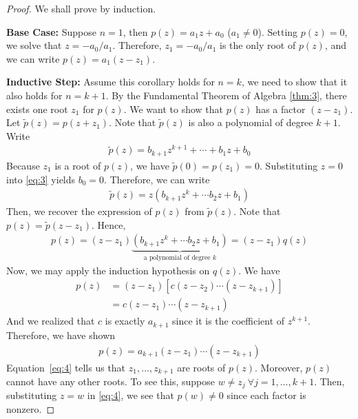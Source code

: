 \documentclass[thmcnt=section, color=cyan, 12pt]{my-elegantbook}
\begin{document}
\begin{proof}
    We shall prove by induction.

    \noindent\textbf{Base Case:} Suppose $n = 1$, then $p(z) = a_1 z + a_0$ ($a_1 \neq 0$). Setting $p(z) = 0$, we solve that $z = -a_0 / a_1$. Therefore, $z_1 = -a_0 / a_1$ is the only root of $p(z)$, and we can write $p(z) = a_1(z - z_1)$.

    \noindent\textbf{Inductive Step:} Assume this corollary holds for $n = k$, we need to show that it also holds for $n = k + 1$.
    By the Fundamental Theorem of Algebra \ref{thm:3}, there exists one root $z_1$ for $p(z)$.
    We want to show that $p(z)$ has a factor $(z - z_1)$.
    Let $\tilde{p}(z) = p(z + z_1)$.
    Note that $\tilde{p}(z)$ is also a polynomial of degree $k + 1$.
    Write
    \begin{align}
        \tilde{p}(z) = b_{k+1} z^{k+1} + \cdots + b_1 z + b_0
        \label{eq:3}
    \end{align}
    Because $z_1$ is a root of $p(z)$, we have $\tilde{p}(0) = p(z_1) = 0$. Substituting $z=0$ into \eqref{eq:3} yields $b_0 = 0$.
    Therefore, we can write
    \begin{align*}
        \tilde{p}(z) = z (b_{k+1} z^{k} + \cdots b_2 z + b_1)
    \end{align*}
    Then, we recover the expression of $p(z)$ from $\tilde{p}(z)$.
    Note that $p(z) = \tilde{p}(z - z_1)$.
    Hence,
    \begin{align*}
        p(z) = (z - z_1) \underbrace{(b_{k+1} z^{k} + \cdots b_2 z + b_1)}_{\text{a polynomial of degree $k$}}
        = (z - z_1) q(z)
    \end{align*}
    Now, we may apply the induction hypothesis on $q(z)$.
    We have
    \begin{align*}
        p(z) & = (z - z_1) [c (z - z_2) \cdots (z - z_{k+1})] \\
             & = c (z - z_1) \cdots (z - z_{k+1})
    \end{align*}
    And we realized that $c$ is exactly $a_{k+1}$ since it is the coefficient of $z^{k+1}$.
    Therefore, we have shown
    \begin{align}
        p(z) = a_{k+1} (z - z_1) \cdots (z - z_{k+1})
        \label{eq:4}
    \end{align}
    Equation~\eqref{eq:4} tells us that $z_1, \ldots, z_{k+1}$ are roots of $p(z)$.
    Moreover, $p(z)$ cannot have any other roots. To see this, suppose $w \neq z_j \ \forall j=1, \ldots, k+1$. Then, substituting $z = w$ in \eqref{eq:4}, we see that $p(w) \neq 0$ since each factor is nonzero.
\end{proof}
\end{document}
